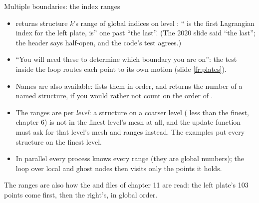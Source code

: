 \documentclass[aspectratio=169,11pt]{beamer}
\begin{document}
\begin{frame}{Multiple boundaries: the index ranges}
\label{fr:multi3}
\footnotesize
\begin{itemize}
  \item {} returns structure $k$'s range of global indices on level : `` is the first Lagrangian index for the left plate,  is'' one past ``the last''. (The 2020 slide said ``the last''; the header says half-open, and the code's  test agrees.)
  \item ``You will need these to determine which boundary you are on'': the test  inside the loop routes each point to its own motion (slide \ref{fr:plates}).
  \item Names are also available:  lists them in order, and  returns the number of a named structure, if you would rather not count on the order of .
  \item The ranges are per \emph{level}: a structure on a coarser level ( less than the finest, chapter 6) is not in the finest level's mesh at all, and the update function must ask for that level's mesh and ranges instead. The examples put every structure on the finest level.
  \item In parallel every process knows every range (they are global numbers); the loop over local and ghost nodes then visits only the points it holds.
\end{itemize}
\vspace{1mm}
\begin{punchbox}
\small The ranges are also how the  and  files of chapter 11 are read: the left plate's 103 points come first, then the right's, in global order.
\end{punchbox}
\end{frame}
\end{document}
